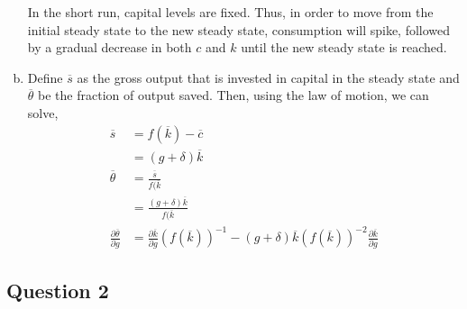 \documentclass{article}
\begin{document}
\begin{enumerate}[(a)]
	In the short run, capital levels are fixed. Thus, in order to move from the initial steady state to the new steady state, consumption will spike, followed by a gradual decrease in both $c$ and $k$ until the new steady state is reached.
	
	\item Define $\overline{s}$ as the gross output that is invested in capital in the steady state and $\overline{\theta}$ be the fraction of output saved. Then, using the law of motion, we can solve,
		\begin{align*}
			\overline{s} 	&= f(\overline{k}) - \overline{c}	\\
							&= (g+\delta)\overline{k}			\\
			\overline{\theta} &= \frac{\overline{s}}{f(\overline{k}} 	\\
							&= \frac{(g+\delta)\overline{k}}{f(\overline{k}}	\\
			\frac{\partial\overline{\theta}}{\partial g} &= \frac{\partial\overline{k}}{\partial g}(f(\overline{k}))^{-1} - (g + \delta)\overline{k}(f(\overline{k}))^{-2}\frac{\partial\overline{k}}{\partial g}
		\end{align*}
	
\end{enumerate}

\subsection*{Question 2}
\end{document}
